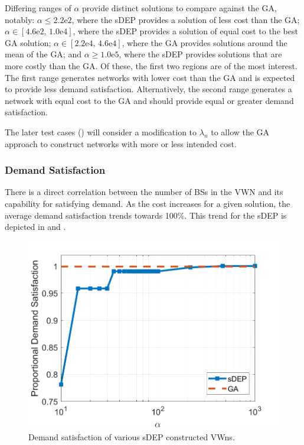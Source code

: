 \documentclass[12pt,dvipsnames]{report}
\newcommand{\expnumber}[2]{{#1}\mathrm{e}{#2}}
\begin{document}
Differing ranges of $\alpha$ provide distinct solutions to compare against the GA, notably: $\alpha \leq \expnumber{2.2}{2}$, where the sDEP provides a solution of less cost than the GA; $\alpha \in \left[ \expnumber{4.6}{2},\, \expnumber{1.0}{4} \right]$, where the sDEP provides a solution of equal cost to the best GA solution; $\alpha \in \left[ \expnumber{2.2}{4},\, \expnumber{4.6}{4} \right]$, where the GA provides solutions around the mean of the GA; and $\alpha \geq \expnumber{1.0}{5}$, where the sDEP provides solutions that are more costly than the GA.  Of these, the first two regions are of the most interest.  The first range generates networks with lower cost than the GA and is expected to provide less demand satisfaction.  Alternatively, the second range generates a network with equal cost to the GA and should provide equal or greater demand satisfaction.

The later test cases () will consider a modification to $\lambda_n$ to allow the GA approach to construct networks with more or less intended cost.

\subsubsection{Demand Satisfaction}

There is a direct correlation between the number of BSs in the VWN and its capability for satisfying demand.  As the cost increases for a given solution, the average demand satisfaction trends towards 100\%.  This trend for the sDEP is depicted in  and .

\begin{figure}[ht]
	\centering
	\includegraphics[height=0.45\textheight]{Figures/Prelim_O25_VOSDemandSatisfaction}
	\caption[Preliminary simulation sDEP demand satisfaction]{Demand satisfaction of various sDEP constructed VWns.}
	\label{fig:Prelim_VOSDemandSatisfaction}
\end{figure}
\end{document}
